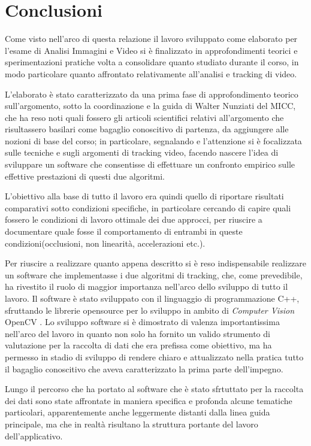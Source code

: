 \section{Conclusioni}

Come visto nell'arco di questa relazione il lavoro sviluppato come elaborato per l'esame di Analisi Immagini e Video si è finalizzato in approfondimenti teorici e sperimentazioni pratiche volta a consolidare quanto studiato durante il corso, in modo particolare quanto affrontato relativamente all'analisi e tracking di video. 

L'elaborato è stato caratterizzato da una prima fase di approfondimento teorico sull'argomento, sotto la coordinazione e la guida di Walter Nunziati del MICC, che ha reso noti quali fossero gli articoli scientifici relativi all'argomento che risultassero basilari come bagaglio conoscitivo di partenza, da aggiungere alle nozioni di base del corso; in particolare, segnalando \cite{kalman-intro} e \cite{condensation} l'attenzione si è focalizzata sulle tecniche e sugli argomenti di tracking video, facendo nascere l'idea di sviluppare un software che consentisse di effettuare un confronto empirico sulle effettive prestazioni di questi due algoritmi.

L'obiettivo alla base di tutto il lavoro era quindi quello di riportare risultati comparativi sotto condizioni specifiche, in particolare cercando di capire quali fossero le condizioni di lavoro ottimale dei due approcci, per riuscire a documentare quale fosse il comportamento di entrambi in queste condizioni(occlusioni, non linearità, accelerazioni etc.).

Per riuscire a realizzare quanto appena descritto si è reso indispensabile realizzare un software che implementasse i due algoritmi di tracking, che, come prevedibile, ha rivestito il ruolo di maggior importanza nell'arco dello sviluppo di tutto il lavoro. Il software è stato sviluppato con il linguaggio di programmazione C++, sfruttando le librerie opensource per lo sviluppo in ambito di \emph{Computer Vision} OpenCV \cite{opencv}. Lo sviluppo software si è dimostrato di valenza importantissima nell'arco del lavoro in quanto non solo ha fornito un valido strumento di valutazione per la raccolta di dati che era prefissa come obiettivo, ma ha permesso in stadio di sviluppo di rendere chiaro e attualizzato nella pratica tutto il bagaglio conoscitivo che aveva caratterizzato la prima parte dell'impegno.

Lungo il percorso che ha portato al software che è stato sfrtuttato per la raccolta dei dati sono state affrontate in maniera specifica e profonda alcune tematiche particolari, apparentemente anche leggermente distanti dalla linea guida principale, ma che in realtà risultano la struttura portante del lavoro dell'applicativo. 

